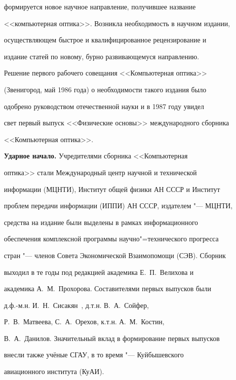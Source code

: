 формируется новое научное направление, получившее название

<<компьютерная оптика>>. Возникла необходимость в научном издании,

осуществляющем быстрое и квалифицированное рецензирование и

издание статей по новому, бурно развивающемуся направлению.

Решение первого рабочего совещания <<Компьютерная оптика>>

(Звенигород, май 1986 года) о необходимости такого издания было

одобрено руководством отечественной науки и в 1987 году увидел

свет первый выпуск <<Физические основы>> международного сборника

<<Компьютерная оптика>>.





\smallskip





\renewcommand{\baselinestretch}{0.9}



{\bf Ударное начало.} Учредителями сборника <<Компьютерная

оптика>> стали Международный центр научной и технической

информации (МЦНТИ), Институт общей физики АН СССР и Институт

проблем передачи информации (ИППИ) АН СССР, издателем "--- МЦНТИ,

средства на издание были выделены в рамках информационного

обеспечения комплексной программы научно"=технического прогресса

стран "--- членов Совета Экономической Взаимопомощи (СЭВ). Сборник

выходил в те годы под редакцией академика Е.~П.~Велихова и

академика А.~М.~Прохорова. Составителями первых выпусков были

д.ф.-м.н. И.~Н.~Сисакян~\cite{kol:bib16}, д.т.н. В.~А.~Сойфер,

Р.~В.~Матвеева, С.~А.~Орехов, к.т.н. А.~М.~Костин,

В.~А.~Данилов. Значительный вклад в формирование первых выпусков

внесли также учёные СГАУ, в то время "--- Куйбышевского

авиационного института (КуАИ).



